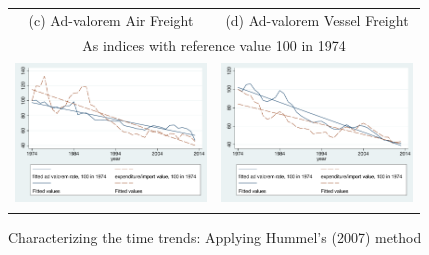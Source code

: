 \documentclass[10 pt,Helvetica, french]{beamer}
\begin{document}

\begin{frame}

\begin{figure}[htbp]
\caption{Characterizing the time trends: Applying Hummel's (2007) method }
\label{fig:comp_effects_as_in_Hummels}
\begin{center}
\begin{tabular}{cc}
{\small (c) Ad-valorem Air Freight} & {\small (d) Ad-valorem Vessel Freight}\\
\multicolumn{2}{c}{{\small As indices with reference value 100 in 1974} }\\
\includegraphics[width=2in, height=1.5in]{figure5_comme_hummels_base100.pdf}
& \includegraphics[width=2in, height=1.5in]{figure6_comme_hummels_base100.pdf} \\
\end{tabular}
\end{center}
\end{figure}


\end{frame}
\end{document}
